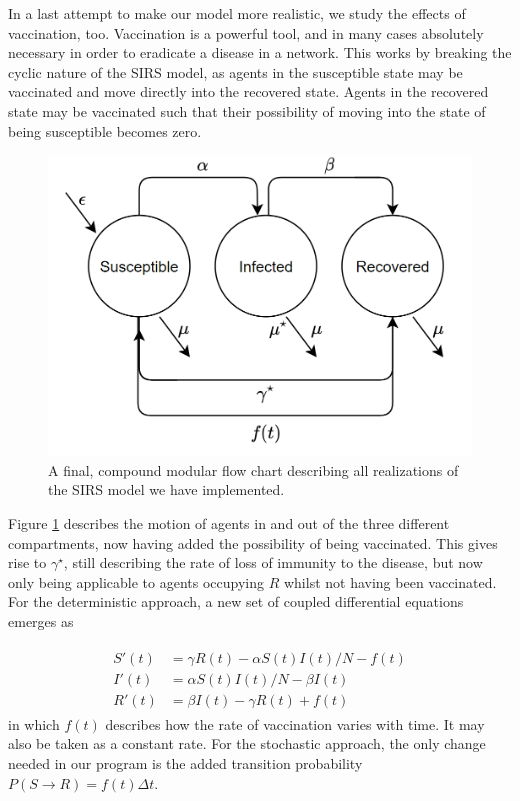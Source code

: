 In a last attempt to make our model more realistic, we study the effects of vaccination, too. Vaccination is a powerful tool, and in many cases absolutely necessary in order to eradicate a disease in a network. This works by breaking the cyclic nature of the SIRS model, as agents in the susceptible state may be vaccinated and move directly into the recovered state. Agents in the recovered state may be vaccinated such that their possibility of moving into the state of being susceptible becomes zero.
\begin{figure}[H]
    \centering
    \includegraphics{Figures/sirvax.PNG}
    \caption{A final, compound modular flow chart describing all realizations of the SIRS model we have implemented.}
    \label{fig:sirsvax}
\end{figure}
Figure \ref{fig:sirsvax} describes the motion of agents in and out of the three different compartments, now having added the possibility of being vaccinated. This gives rise to $\gamma^\star$, still describing the rate of loss of immunity to the disease, but now only being applicable to agents occupying $R$ whilst not having been vaccinated.\\

For the deterministic approach, a new set of coupled differential equations emerges as

\begin{align}
    \begin{split}
        S'(t) &= \gamma R(t) - \alpha S(t)I(t)/N - f(t)\\
        I'(t) &= \alpha S(t)I(t)/N - \beta I(t)\\
        R'(t) &= \beta I(t) - \gamma R(t) + f(t)
        \label{SIRSvax}
    \end{split}
\end{align}
in which $f(t)$ describes how the rate of vaccination varies with time. It may also be taken as a constant rate. For the stochastic approach, the only change needed in our program is the added transition probability $P(S\to R) = f(t)\Delta t$. 

